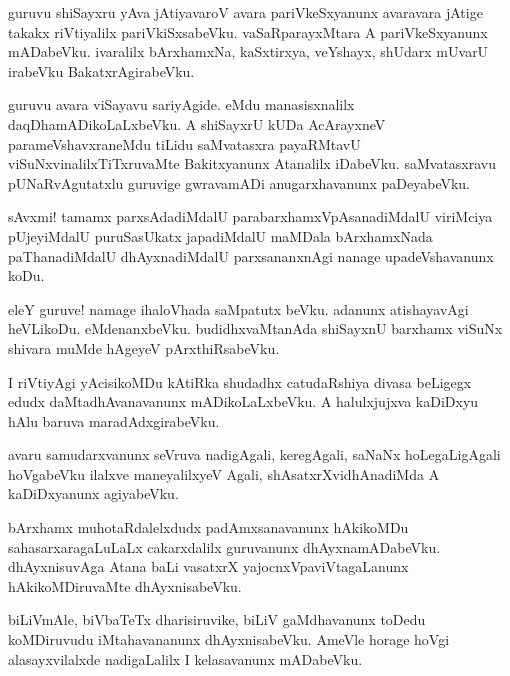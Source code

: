 \begin{mng}
guruvu shiSayxru yAva jAtiyavaroV avara pariVkeSxyanunx avaravara jAtige takakx riVtiyalilx pariVkiSxsabeVku. vaSaRparayxMtara A pariVkeSxyanunx mADabeVku. ivaralilx bArxhamxNa, kaSxtirxya, veYshayx, shUdarx mUvarU irabeVku BakatxrAgirabeVku.
\end{mng}

\begin{mng}
guruvu avara viSayavu sariyAgide. eMdu manasisxnalilx daqDhamADikoLaLxbeVku. A shiSayxrU kUDa AcArayxneV parameVshavxraneMdu tiLidu saMvatasxra payaRMtavU viSuNxvinalilxTiTxruvaMte Bakitxyanunx Atanalilx iDabeVku. saMvatasxravu pUNaRvAgutatxlu guruvige gwravamADi anugarxhavanunx paDeyabeVku.
\end{mng}

\begin{mng}
sAvxmi! tamamx parxsAdadiMdalU parabarxhamxVpAsanadiMdalU viriMciya pUjeyiMdalU puruSasUkatx japadiMdalU maMDala bArxhamxNada paThanadiMdalU dhAyxnadiMdalU parxsananxnAgi nanage upadeVshavanunx koDu.
\end{mng}

\begin{mng}
eleY guruve! namage ihaloVhada saMpatutx beVku. adanunx atishayavAgi heVLikoDu. eMdenanxbeVku. budidhxvaMtanAda shiSayxnU barxhamx viSuNx shivara muMde hAgeyeV pArxthiRsabeVku.
\end{mng}

\begin{mng}
I riVtiyAgi yAcisikoMDu kAtiRka shudadhx catudaRshiya divasa beLigegx edudx daMtadhAvanavanunx mADikoLaLxbeVku. A halulxjujxva kaDiDxyu hAlu baruva maradAdxgirabeVku.
\end{mng}

\begin{mng}
avaru samudarxvanunx seVruva nadigAgali, keregAgali, saNaNx hoLegaLigAgali hoVgabeVku ilalxve maneyalilxyeV Agali, shAsatxrXvidhAnadiMda A kaDiDxyanunx agiyabeVku.
\end{mng}

\begin{mng}
bArxhamx muhotaRdalelxdudx padAmxsanavanunx hAkikoMDu sahasarxaragaLuLaLx cakarxdalilx guruvanunx dhAyxnamADabeVku. dhAyxnisuvAga Atana baLi vasatxrX yajocnxVpaviVtagaLanunx hAkikoMDiruvaMte dhAyxnisabeVku.
\end{mng}

\begin{mng}
biLiVmAle, biVbaTeTx dharisiruvike, biLiV gaMdhavanunx toDedu koMDiruvudu iMtahavananunx dhAyxnisabeVku.  AmeVle horage hoVgi alasayxvilalxde nadigaLalilx I kelasavanunx mADabeVku.
\end{mng}

